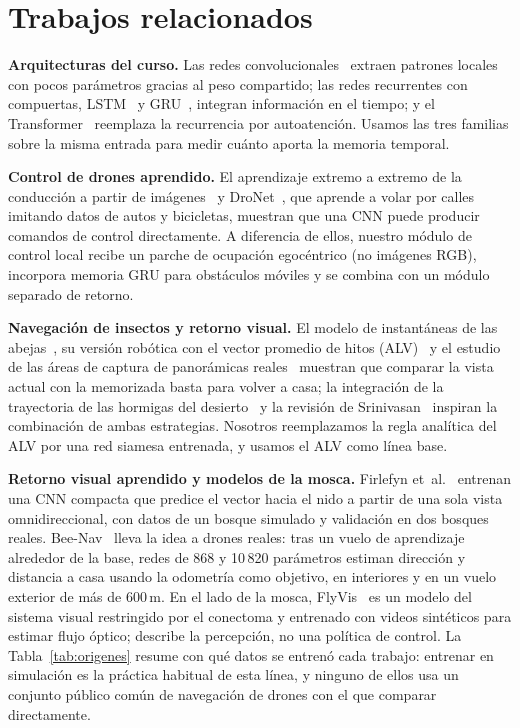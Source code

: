\section{Trabajos relacionados}
\textbf{Arquitecturas del curso.} Las redes convolucionales~\cite{lecun1998} extraen patrones
locales con pocos parámetros gracias al peso compartido; las redes recurrentes con compuertas,
LSTM~\cite{hochreiter1997} y GRU~\cite{cho2014}, integran información en el tiempo; y el
Transformer~\cite{vaswani2017} reemplaza la recurrencia por autoatención. Usamos las tres
familias sobre la misma entrada para medir cuánto aporta la memoria temporal.

\textbf{Control de drones aprendido.} El aprendizaje extremo a extremo de la conducción a
partir de imágenes~\cite{bojarski2016} y DroNet~\cite{loquercio2018}, que aprende a volar
por calles imitando datos de autos y bicicletas, muestran que una CNN puede producir
comandos de control directamente. A diferencia de ellos, nuestro módulo de control local
recibe un parche de ocupación egocéntrico (no imágenes RGB), incorpora memoria GRU para
obstáculos móviles y se combina con un módulo separado de retorno.

\textbf{Navegación de insectos y retorno visual.} El modelo de instantáneas de las
abejas~\cite{cartwright1983}, su versión robótica con el vector promedio de hitos
(ALV)~\cite{lambrinos2000} y el estudio de las áreas de captura de panorámicas
reales~\cite{zeil2003} muestran que comparar la vista actual con la memorizada basta para
volver a casa; la integración de la trayectoria de las hormigas del desierto~\cite{wehner2003}
y la revisión de Srinivasan~\cite{srinivasan2011} inspiran la combinación de ambas
estrategias. Nosotros reemplazamos la regla analítica del ALV por una red siamesa entrenada,
y usamos el ALV como línea base.

\textbf{Retorno visual aprendido y modelos de la mosca.} Firlefyn
et~al.~\cite{firlefyn2024} entrenan una CNN compacta que predice el vector hacia el nido a
partir de una sola vista omnidireccional, con datos de un bosque simulado y validación en dos
bosques reales. Bee-Nav~\cite{ou2026} lleva la idea a drones reales: tras un vuelo de
aprendizaje alrededor de la base, redes de 868 y 10\,820 parámetros estiman dirección y
distancia a casa usando la odometría como objetivo, en interiores y en un vuelo exterior de
más de 600\,m. En el lado de la mosca, FlyVis~\cite{lappalainen2024} es un modelo del sistema
visual restringido por el conectoma y entrenado con videos sintéticos para estimar flujo
óptico; describe la percepción, no una política de control. La Tabla~\ref{tab:origenes}
resume con qué datos se entrenó cada trabajo: entrenar en simulación es la práctica habitual
de esta línea, y ninguno de ellos usa un conjunto público común de navegación de drones con
el que comparar directamente.

